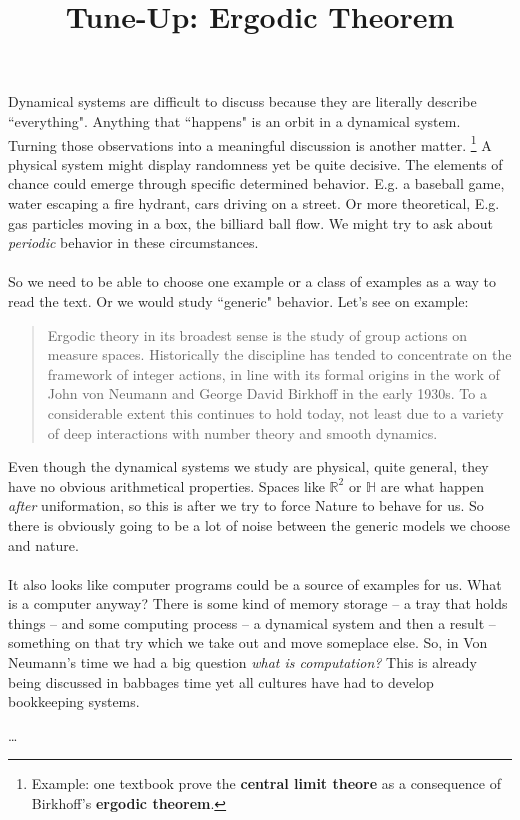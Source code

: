 \documentclass[12pt]{article}
\title{Tune-Up: Ergodic Theorem}
\date{}
\begin{document}
\sffamily

\maketitle

\noindent Dynamical systems are difficult to discuss because they are literally describe ``everything".  Anything that ``happens" is an orbit in a dynamical system.  Turning those observations into a meaningful discussion is another matter.  \footnote{Example:  one textbook prove the \textbf{central limit theore} as a consequence of Birkhoff's \textbf{ergodic theorem}.}  A physical system might display randomness yet be quite decisive.  The elements of chance could emerge through specific determined behavior. E.g. a baseball game, water escaping a fire hydrant, cars driving on a street.  Or more theoretical, E.g. gas particles moving in a box, the billiard ball flow.  We might try to ask about \textit{periodic} behavior in these circumstances.  \\ \\
So we need to be able to choose one example or a class of examples as a way to read the text.  Or we would study ``generic" behavior.  Let's see on example:

\begin{quotation}
Ergodic theory in its broadest sense is the study of group actions on measure spaces.
Historically the discipline has tended to concentrate on the framework of integer
actions, in line with its formal origins in the work of John von Neumann and
George David Birkhoff in the early 1930s. To a considerable extent this continues
to hold today, not least due to a variety of deep interactions with number theory and
smooth dynamics. \end{quotation}
Even though the dynamical systems we study are physical, quite general, they have no obvious arithmetical properties.  Spaces like $\mathbb{R}^2$ or $\mathbb{H}$ are what happen \textit{after} uniformation, so this is after we try to force Nature to behave for us.  So there is obviously going to be a lot of noise between the generic models we choose and nature.  \\ \\
It also looks like computer programs could be a source of examples for us.  What is a computer anyway?  There is some kind of memory storage -- a tray that holds things -- and some computing process -- a dynamical system and then a result -- something on that try which we take out and move someplace else.  So, in Von Neumann's time we had a big question \textit{what is computation?} This is already being discussed in babbages time yet all cultures have had to develop bookkeeping systems. 

\begin{thebibliography}{}

\item  \dots 

\end{thebibliography}
\end{document}
